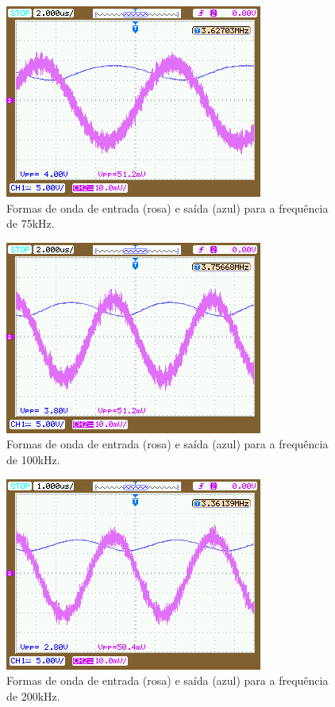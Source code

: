 \documentclass{abntex2}
\begin{document}
  \begin{figure}[h]
    \centering
    \includegraphics[scale = 0.5]{freq_75k.png}
    \caption{Formas de onda de entrada (rosa) e saída (azul) para a frequência de 75kHz.}
    \label{fig:freq8}
  \end{figure}

  \begin{figure}[h]
    \centering
    \includegraphics[scale = 0.5]{freq_100k.png}
    \caption{Formas de onda de entrada (rosa) e saída (azul) para a frequência de 100kHz.}
    \label{fig:freq9}
  \end{figure}

  \begin{figure}[h]
    \centering
    \includegraphics[scale = 0.5]{freq_200k.png}
    \caption{Formas de onda de entrada (rosa) e saída (azul) para a frequência de 200kHz.}
    \label{fig:freq10}
  \end{figure}
\end{document}
